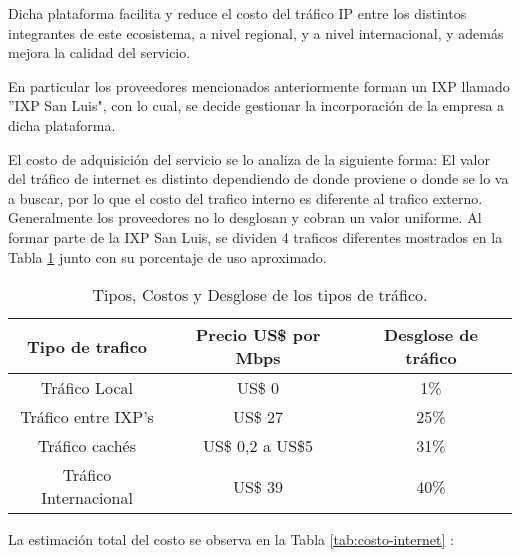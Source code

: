 \begin{itemize}
Dicha plataforma facilita y reduce el costo del tráfico IP entre los distintos integrantes de este
ecosistema, a nivel regional, y a nivel internacional, y además mejora la calidad
del servicio.

En particular los proveedores mencionados anteriormente forman un IXP llamado 
''IXP San Luis", con lo cual, se decide gestionar la incorporación de la 
empresa a dicha plataforma.

El costo de adquisición del servicio se lo analiza de la siguiente forma:
El valor del tráfico de internet es distinto dependiendo de donde proviene o 
donde se lo va a buscar, por lo que el costo del trafico interno es diferente
al trafico externo.
Generalmente los proveedores no lo desglosan y cobran un valor uniforme.
Al formar parte de la IXP San Luis, se dividen 4 traficos diferentes mostrados
en la Tabla \ref{tab:trafico} junto con su porcentaje de uso aproximado.


\begin{table}[H]
  \centering
    \begin{tabular}{|c|c|c|}
    \hline
    \rowcolor[rgb]{ .773,  .851,  .945} \textbf{Tipo de trafico} & \textbf{Precio US\$ por Mbps} & \textbf{Desglose de tráfico} \bigstrut\\
    \hline
    Tráfico Local & US\$ 0 & 1\% \bigstrut\\
    \hline
    Tráfico entre IXP's & US\$ 27 & 25\% \bigstrut\\
    \hline
    Tráfico cachés & US\$ 0,2 a US\$5 & 31\% \bigstrut\\
    \hline
    Tráfico Internacional & US\$ 39 & 40\% \bigstrut\\
    \hline
    \end{tabular}%
	\caption{Tipos, Costos y Desglose de los tipos de tráfico.}
  \label{tab:trafico}%
\end{table}%

La estimación total del costo se observa en la Tabla \ref{tab:costo-internet} :


\end{itemize}
